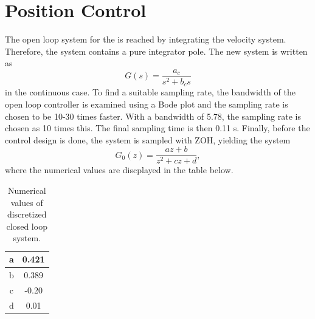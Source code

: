 \documentclass[12pt,a4paper]{article}
\begin{document}
\section*{Position Control}
The open loop system for the is reached by integrating the velocity system.
Therefore, the system contains a pure integrator pole. The new system is written
as
\begin{equation}
    \label{eq:possystem}
    G(s) = \frac{a_c}{s^2+b_c s}
\end{equation}
in the continuous case. To find a suitable sampling rate, the bandwidth of the
open loop controller is examined using a Bode plot and the sampling rate is
chosen to be 10-30 times faster. With a bandwidth of 5.78, the sampling rate is
chosen as 10 times this. The final sampling time is then 0.11 s. Finally, before
the control design is done, the system is sampled with ZOH, yielding the system
\begin{equation}
    \label{eq:discretepos}
    G_0(z) = \frac{a z + b}{z^2 + cz + d},
\end{equation}
where the numerical values are discplayed in the table below.
\begin{table}[H]
    \centering
    \caption{Numerical values of discretized closed loop system.}
    \label{tab:discretetable}
    \begin{tabular}{|c  | c |}
        \hline
        a &  0.421 \\
        \hline
        b & 0.389 \\
        \hline
        c & -0.20 \\
        \hline
        d & 0.01 \\
        \hline
    \end{tabular}
\end{table}
\end{document}
